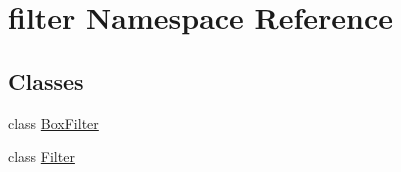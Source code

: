 \hypertarget{namespacefilter}{}\section{filter Namespace Reference}
\label{namespacefilter}
\subsection*{Classes}
\begin{DoxyCompactItemize}
\item 
class \mbox{\hyperlink{classfilter_1_1BoxFilter}{Box\+Filter}}
\item 
class \mbox{\hyperlink{classfilter_1_1Filter}{Filter}}
\end{DoxyCompactItemize}
